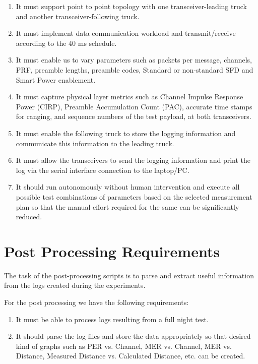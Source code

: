 \begin{enumerate}
    \item It must support point to point topology with one transceiver-leading truck and another transceiver-following truck. 
    \item It must implement data communication workload and transmit/receive according to the 40 ms schedule.
    \item It must enable us to vary parameters such as packets per message, channels, PRF, preamble lengths, preamble codes, Standard or non-standard SFD and Smart Power enablement.
    \item It must capture physical layer metrics such as Channel Impulse Response Power (CIRP), Preamble Accumulation Count (PAC), accurate time stamps for ranging, and sequence numbers of the test payload, at both transceivers.
    \item It must enable the following truck to store the logging information and communicate this information to the leading truck.
    \item It must allow the transceivers to send the logging information and print the log via the serial interface connection to the laptop/PC.
    \item It should run autonomously without human intervention and execute all possible test combinations of parameters based on the selected measurement plan so that the manual effort required for the same can be significantly reduced.
\end{enumerate}

\section{Post Processing Requirements}
The task of the post-processing scripts is to parse and extract useful information from the logs created during the experiments.

For the post processing we have the following requirements:
\begin{enumerate}
    \item It must be able to process logs resulting from a full night test.
    \item It should parse the log files and store the data appropriately so that desired kind of graphs such as PER vs. Channel, MER vs. Channel, MER vs. Distance, Measured Distance vs. Calculated Distance, etc. can be created.
\end{enumerate}